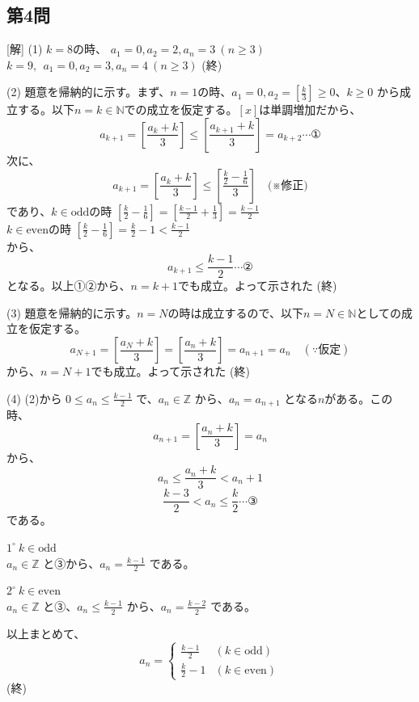 \documentclass[../main.tex]{subfiles}
\begin{document}
\subsection*{第4問}
[解] (1) $k=8$の時、 $a_1 = 0, a_2 = 2, a_n = 3 \ (n \ge 3)$ \\
$k=9, \ \ a_1 = 0, a_2 = 3, a_n = 4 \ (n \ge 3)$ \hfill(終)

(2) 題意を帰納的に示す。まず、$n=1$の時、$a_1=0, a_2 = [\frac{k}{3}] \ge 0$、$k \ge 0$ から成立する。以下$n=k \in \mathbb{N}$での成立を仮定する。$[x]$は単調増加だから、
\[ a_{k+1} = \left[ \frac{a_k + k}{3} \right] \le \left[ \frac{a_{k+1} + k}{3} \right] = a_{k+2} \cdots \text{①} \]
次に、
\[ a_{k+1} = \left[ \frac{a_k + k}{3} \right] \le \left[ \frac{\frac{k}{2} - \frac{1}{6}}{3} \right] \quad \text{(※修正)} \]
であり、$k \in \text{odd}$の時 $\left[ \frac{k}{2} - \frac{1}{6} \right] = \left[ \frac{k-1}{2} + \frac{1}{3} \right] = \frac{k-1}{2}$ \\
$k \in \text{even}$の時 $\left[ \frac{k}{2} - \frac{1}{6} \right] = \frac{k}{2} - 1 < \frac{k-1}{2}$ \\
から、
\[ a_{k+1} \le \frac{k-1}{2} \cdots \text{②} \]
となる。以上①②から、$n=k+1$でも成立。よって示された \hfill(終)

(3) 題意を帰納的に示す。$n=N$の時は成立するので、以下$n=N \in \mathbb{N}$としての成立を仮定する。
\[ a_{N+1} = \left[ \frac{a_N + k}{3} \right] = \left[ \frac{a_n + k}{3} \right] = a_{n+1} = a_n \quad (\because \text{仮定}) \]
から、$n=N+1$でも成立。よって示された \hfill(終)

(4) (2)から $0 \le a_n \le \frac{k-1}{2}$ で、$a_n \in \mathbb{Z}$ から、$a_n = a_{n+1}$ となる$n$がある。この時、
\[ a_{n+1} = \left[ \frac{a_n + k}{3} \right] = a_n \]
から、
\[ a_n \le \frac{a_n + k}{3} < a_n + 1 \]
\[ \frac{k-3}{2} < a_n \le \frac{k}{2} \cdots \text{③} \]
である。

$1^\circ \ k \in \text{odd}$ \\
$a_n \in \mathbb{Z}$ と③から、$a_n = \frac{k-1}{2}$ である。

$2^\circ \ k \in \text{even}$ \\
$a_n \in \mathbb{Z}$ と③、$a_n \le \frac{k-1}{2}$ から、$a_n = \frac{k-2}{2}$ である。

以上まとめて、
\[ a_n =
  \begin{cases} \frac{k-1}{2} & (k \in \text{odd}) \\ \frac{k}{2} - 1 & (k \in \text{even})
\end{cases} \] \hfill(終)
\end{document}

